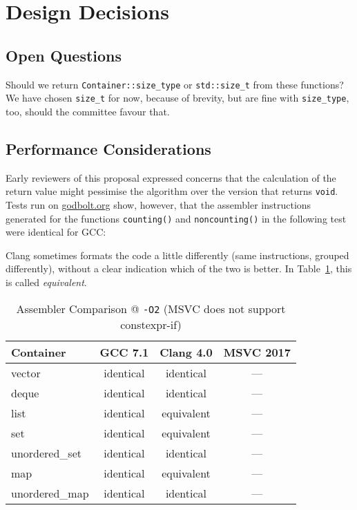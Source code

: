 \documentclass[11pt]{article}
\begin{document}
\section{Design Decisions}

\subsection{Open Questions}

Should we return \texttt{Container::size\_type} or
\texttt{std::size\_t} from these functions? We have chosen
\texttt{size\_t} for now, because of brevity, but are fine with
\texttt{size\_type}, too, should the committee favour that.

\subsection{Performance Considerations}

Early reviewers of this proposal expressed concerns that the
calculation of the return value might pessimise the algorithm over the
version that returns \texttt{void}. Tests run on \url{godbolt.org}
show, however, that the assembler instructions generated for the
functions \texttt{counting()} and \texttt{noncounting()} in the
following test were identical for GCC:



Clang sometimes formats the code a little differently (same
instructions, grouped differently), without a clear indication which
of the two is better. In Table~\ref{tab:asm}, this is called
\emph{equivalent}.

\begin{table}
  \centering
  \begin{tabular}[t]{|l||c|c|c|}
    \hline
    Container      & GCC 7.1   & Clang 4.0  & MSVC 2017 \\ \hline\hline
    vector         & identical & identical  & --- \\
    deque          & identical & identical  & --- \\
    list           & identical & equivalent & --- \\
    set            & identical & equivalent & --- \\
    unordered\_set & identical & identical  & --- \\
    map            & identical & equivalent & --- \\
    unordered\_map & identical & identical  & --- \\ \hline
  \end{tabular}
  \caption{Assembler Comparison @ \texttt{-O2} (MSVC does not support constexpr-if)}
  \label{tab:asm}
\end{table}
\end{document}

